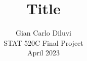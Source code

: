 \documentclass{article}
\title{Title}
\author{%
  Gian Carlo Diluvi \\
  STAT 520C Final Project \\
  April 2023
}
\begin{document}
\onehalfspacing
\maketitle






\clearpage
\small





\end{document}
